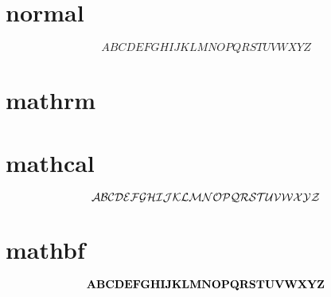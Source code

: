 \documentclass{article}
\begin{document}
    \section{normal}
    $$
    ABCDEFGHIJKLMNOPQRSTUVWXYZ
    $$
    \section{mathrm}
    
    \section{mathcal}
    $$
    \cA\cB\cC\cD\cE\cF\cG\cH\cI\cJ\cK\cL\cM\cN\cO\cP\cQ\cR\cS\cT\cU\cV\cW\cX\cY\cZ
    $$
    \section{mathbf}
    $$
    \bA\bB\bC\bD\bE\bF\bG\bH\bI\bJ\bK\bL\bM\bN\bO\bP\bQ\bR\bS\bT\bU\bV\bW\bX\bY\bZ
    $$
\end{document}

